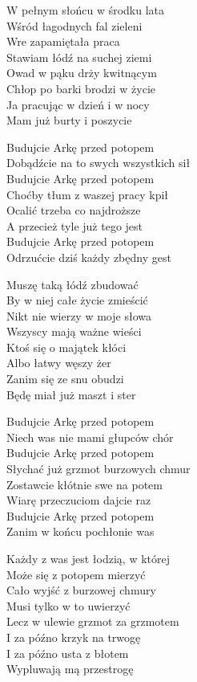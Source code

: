 \begin{textn}
    W pełnym słońcu w środku lata\\
    Wśród łagodnych fal zieleni\\
    Wre zapamiętała praca\\
    Stawiam łódź na suchej ziemi\\
    Owad w pąku drży kwitnącym\\
    Chłop po barki brodzi w życie\\
    Ja pracując w dzień i w nocy\\
    Mam już burty i poszycie

    Budujcie Arkę przed potopem\\
    Dobądźcie na to swych wszystkich sił\\
    Budujcie Arkę przed potopem\\
    Choćby tłum z waszej pracy kpił\\
    Ocalić trzeba co najdroższe\\
    A przecież tyle już tego jest\\
    Budujcie Arkę przed potopem\\
    Odrzućcie dziś każdy zbędny gest

    Muszę taką łódź zbudować\\
    By w niej całe życie zmieścić\\
    Nikt nie wierzy w moje słowa\\
    Wszyscy mają ważne wieści\\
    Ktoś się o majątek kłóci\\
    Albo łatwy węszy żer\\
    Zanim się ze snu obudzi\\
    Będę miał już maszt i ster

    Budujcie Arkę przed potopem\\
    Niech was nie mami głupców chór\\
    Budujcie Arkę przed potopem\\
    Słychać już grzmot burzowych chmur\\
    Zostawcie kłótnie swe na potem\\
    Wiarę przeczuciom dajcie raz\\
    Budujcie Arkę przed potopem\\
    Zanim w końcu pochłonie was

    Każdy z was jest łodzią, w której\\
    Może się z potopem mierzyć\\
    Cało wyjść z burzowej chmury\\
    Musi tylko w to uwierzyć\\
    Lecz w ulewie grzmot za grzmotem\\
    I za późno krzyk na trwogę\\
    I za późno usta z błotem\\
    Wypluwają mą przestrogę


\end{textn}
